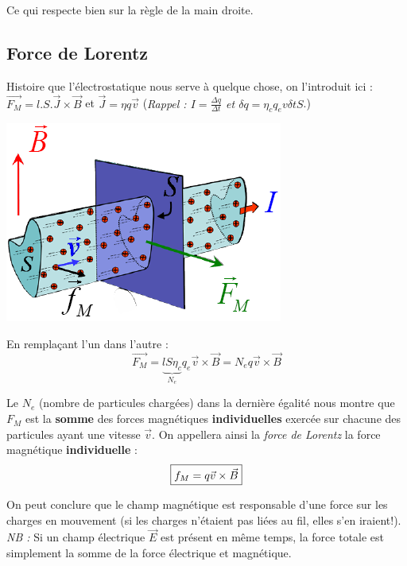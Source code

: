 \documentclass	[11pt, a4paper, openany]{book}
\begin{document}
Ce qui respecte bien sur la règle de la main droite.

\subsection{Force de Lorentz}
Histoire que l'électrostatique nous serve à quelque chose, on l'introduit ici :
$\vec{F_M} =  l.S.\vec{J} \times \vec{B}$ et $\vec{J} =  \eta q \vec{v}$ (\textit{Rappel  : $I = \frac{\Delta q}{\Delta t}$ et $\delta q = \eta_c q_e v \delta t S$}.) 
\begin{center}
	\includegraphics[scale=0.55]{magneto/image4.png}
\end{center}
En remplaçant l'un dans l'autre :
\begin{equation}
	\vec{F_M} = \underbrace{lS\eta_c}_{N_e} q_e \vec{v} \times \vec{B} = N_eq \vec{v} \times \vec{B}
\end{equation}

Le $N_e$ (nombre de particules chargées) dans la dernière égalité nous montre que $F_M$ est la \textbf{somme} des forces magnétiques \textbf{individuelles} exercée sur chacune des particules ayant une vitesse $\vec{v}$. On appellera ainsi la \textit{force de Lorentz} la force magnétique \textbf{individuelle} :
\begin{equation}
	\fbox{$f_M = q \vec{v} \times \vec{B} $}
\end{equation}

On peut conclure que le champ magnétique est responsable d'une force sur les charges en mouvement (si les charges n'étaient pas liées au fil, elles s'en iraient!).\\


\textit{NB : } Si un champ électrique $\vec{E}$ est présent en même temps, la force totale est simplement la somme de la force électrique et magnétique.
\end{document}
